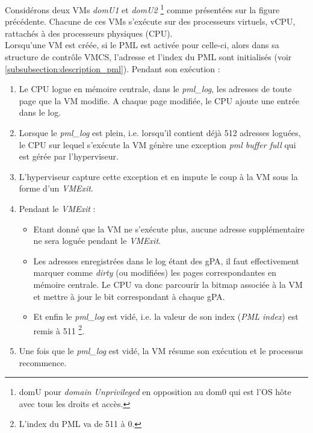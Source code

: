 Considérons deux VMs \textit{domU1} et \textit{domU2} \footnote{domU pour \textit{domain Unprivileged} en opposition au dom0 qui est l'OS hôte avec tous les droits et accès.} comme présentées sur la figure précédente. Chacune de ces VMs s'exécute sur des processeurs virtuels, \ac{vCPU}, rattachés à des processeurs physiques (\acs{CPU}).\\
Lorsqu'une VM est créée, si le PML est activée pour celle-ci, alors dans sa structure de contrôle \ac{VMCS}, l'adresse et l'index du PML sont initialisés (voir \ref{subsubsection:description_pml}). Pendant son exécution :

\begin{enumerate}[label=\textbf{(\roman*)}]
    \item Le CPU logue en mémoire centrale, dans le \textit{pml\_log}, les adresses de toute page que la VM modifie. A chaque page modifiée, le CPU ajoute une entrée dans le log.
    \item Lorsque le \textit{pml\_log} est plein, i.e. lorsqu'il contient déjà 512 adresses loguées, le CPU sur lequel s'exécute la VM génère une exception \textit{pml buffer full} qui est gérée par l'hyperviseur.
    \item L'hyperviseur capture cette exception et en impute le coup à la VM sous la forme d'un \textit{VMExit}.
    \item Pendant le \textit{VMExit} :
    
        \begin{itemize}
            \item Etant donné que la VM ne s'exécute plus, aucune adresse supplémentaire ne sera loguée pendant le \textit{VMExit}.
            \item Les adresses enregistrées dans le log étant des \acl{gPA}, il faut effectivement marquer comme \textit{dirty} (ou modifiées) les pages correspondantes en mémoire centrale. Le CPU va donc parcourir la bitmap associée à la VM et mettre à jour le bit correspondant à chaque gPA.
            \item Et enfin le \textit{pml\_log} est vidé, i.e. la valeur de son index (\textit{PML index}) est remis à 511 \footnote{L'index du PML va de 511 à 0.}. 
        \end{itemize}
    
    \item Une fois que le \textit{pml\_log} est vidé, la VM résume son exécution et le processus recommence.
\end{enumerate}


